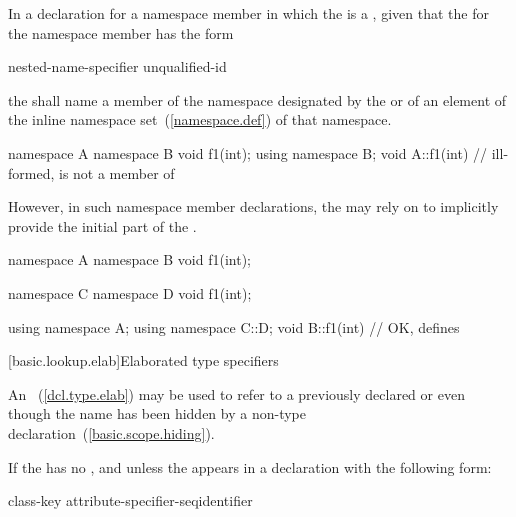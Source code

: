 \pnum
In a declaration for a namespace member in which the
 is a , given that the
 for the namespace member has the form

\begin{ncbnf}
nested-name-specifier unqualified-id
\end{ncbnf}

the
 shall name a member of the namespace
designated by the 
or of an element of the inline namespace set~(\ref{namespace.def}) of that namespace.
\enterexample

\begin{codeblock}
namespace A {
  namespace B {
    void f1(int);
  }
  using namespace B;
}
void A::f1(int){ }  // ill-formed,  is not a member of 
\end{codeblock}

\exitexample However, in such namespace member declarations, the
 may rely on 
to implicitly provide the initial part of the
. \enterexample

\begin{codeblock}
namespace A {
  namespace B {
    void f1(int);
  }
}

namespace C {
  namespace D {
    void f1(int);
  }
}

using namespace A;
using namespace C::D;
void B::f1(int){ }  // OK, defines 
\end{codeblock}
\exitexample 
{}%

[basic.lookup.elab]{Elaborated type specifiers}%
%

\pnum
An ~(\ref{dcl.type.elab}) may be
used to refer to a previously declared  or
 even though the name has been hidden by a non-type
declaration~(\ref{basic.scope.hiding}).

\pnum
If the  has no
, and unless the
 appears in a declaration with the
following form:

\begin{ncbnf}
class-key attribute-specifier-seq\opt identifier \terminal{;}
\end{ncbnf}

